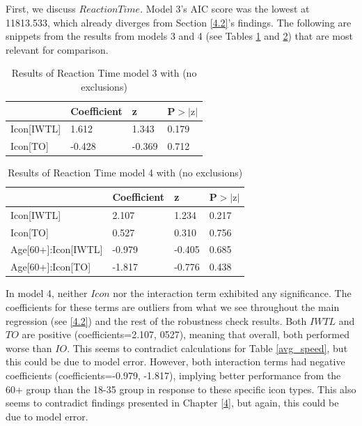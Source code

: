 \documentclass[12pt,twoside]{reedthesis}
\begin{document}
    First, we discuss $ReactionTime$. Model 3's AIC score was the lowest at 11813.533, which already diverges from Section \ref{4.2}'s findings. The following are snippets from the results from models 3 and 4 (see Tables \ref{ne_m3_speed} and \ref{ne_m4_speed}) that are most relevant for comparison.

    \begin{table}[H]
        \centering
        \begin{tabular}{| p{3.5cm} | p{2.5cm} | p{2.5cm} | p{2.5cm} |}
            \hline
            & Coefficient & z & P$>|\text{z}|$\\
            \hline
            Icon[IWTL] & 1.612 & 1.343 & 0.179\\
            \hline
            Icon[TO] & -0.428 & -0.369 & 0.712\\
            \hline
        \end{tabular}
        \caption{Results of Reaction Time model 3 with (no exclusions)}
        \label{ne_m3_speed}
    \end{table}

    \begin{table}[H]
        \centering
        \begin{tabular}{| p{5cm} | p{2.5cm} | p{2.5cm} | p{2.5cm} |}
            \hline
            & Coefficient & z & P$>|\text{z}|$\\
            \hline
            Icon[IWTL] & 2.107 & 1.234 & 0.217\\
            \hline
            Icon[TO] & 0.527 & 0.310 & 0.756\\
            \hline
            Age[60+]:Icon[IWTL] & -0.979 & -0.405 & 0.685\\
            \hline
            Age[60+]:Icon[TO] & -1.817 & -0.776 & 0.438\\
            \hline
        \end{tabular}
        \caption{Results of Reaction Time model 4 with (no exclusions)}
        \label{ne_m4_speed}
    \end{table}

    In model 4, neither $Icon$ nor the interaction term exhibited any significance. The coefficients for these terms are outliers from what we see throughout the main regression (see \ref{4.2}) and the rest of the robustness check results. Both $IWTL$ and $TO$ are positive (coefficients=2.107, 0527), meaning that overall, both performed worse than $IO$. This seems to contradict calculations for Table \ref{avg_speed}, but this could be due to model error. However, both interaction terms had negative coefficients (coefficients=-0.979, -1.817), implying better performance from the 60+ group than the 18-35 group in response to these specific icon types. This also seems to contradict findings presented in Chapter \ref{4}, but again, this could be due to model error.
    
\end{document}
